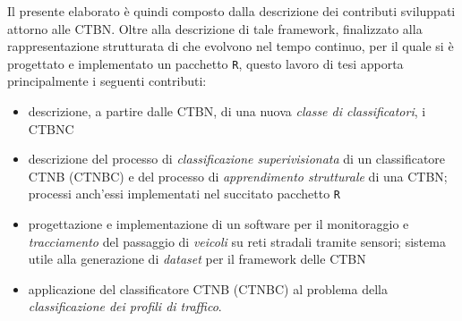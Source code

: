Il presente elaborato è quindi composto dalla descrizione dei contributi sviluppati attorno alle \acl{CTBN}. Oltre alla descrizione di tale framework, finalizzato alla rappresentazione strutturata di \mprocess{} che evolvono nel tempo continuo, per il quale si è progettato e implementato un pacchetto \lstinline[]|R|, questo lavoro di tesi apporta principalmente i seguenti contributi:
\begin{itemize}
	\item descrizione, a partire dalle \acs{CTBN}, di una nuova \emph{classe di classificatori}, i \acf{CTBNC} \citep{Stella2012}
	\item descrizione del processo di \emph{classificazione superivisionata} di un classificatore \acl{CTNB} (\acs{CTNBC}) e del processo di \emph{apprendimento strutturale} di una \acs{CTBN}; processi anch'essi implementati nel succitato pacchetto \lstinline[]|R|
	\item progettazione e implementazione di un software per il monitoraggio e \emph{tracciamento} del passaggio di \emph{veicoli} su reti stradali tramite sensori; sistema utile alla generazione di \emph{dataset} per il framework delle \acs{CTBN}
	\item applicazione del classificatore \acs{CTNB} (\acs{CTNBC}) al problema della \emph{classificazione dei profili di traffico}.
\end{itemize}


